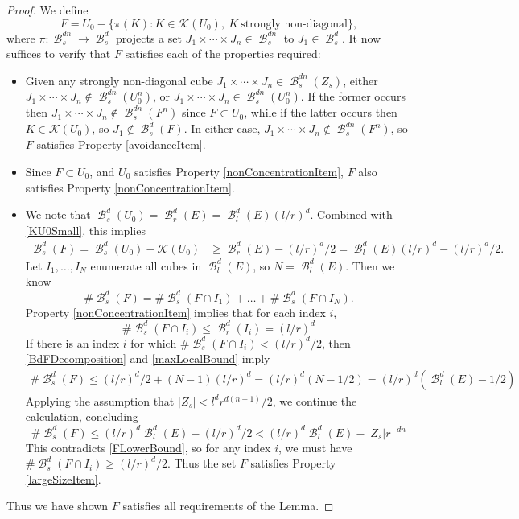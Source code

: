 \documentclass[dvipsnames,letterpaper,12pt]{article}
\numberwithin{equation}{section}
\theoremstyle{plain}
\DeclareMathOperator{\B}{\mathcal{B}}
\begin{document}
\begin{proof}
	We define
	\begin{equation}\label{defnOfF}
		F = U_0 - \{ \pi(K)\colon K\in \mathcal{K}(U_0),\ K\ \textrm{strongly non-diagonal} \},
	\end{equation} 
	where $\pi\colon \B_s^{dn}\to \B_s^d$ projects a set $J_1\times\cdots\times J_n \in \B_s^{dn}$ to $J_1 \in \B_s^d$. It now suffices to verify that $F$ satisfies each of the properties required:
	\begin{itemize}
		\item Given any strongly non-diagonal cube $J_1 \times \cdots \times J_n \in \B_s^{dn}(Z_s)$, either $J_1 \times \cdots \times J_n \not \in \B_s^{dn}(U_0^n)$, or $J_1 \times \cdots \times J_n \in \B_s^{dn}(U_0^n)$. If the former occurs then $J_1 \times \cdots \times J_n \not \in \B_s^{dn}(F^n)$ since $F\subset U_0$, while if the latter occurs then $K \in \mathcal{K}(U_0)$, so $J_1 \not \in \B_s^d(F)$. In either case, $J_1 \times \cdots \times J_n \not \in \B_s^{dn}(F^n)$, so $F$ satisfies Property \ref{avoidanceItem}.

		\item Since $F\subset U_0$, and $U_0$ satisfies Property \ref{nonConcentrationItem}, $F$ also satisfies Property \ref{nonConcentrationItem}.

		\item We note that $\B^d_s(U_0) = \B^d_r(E) = \B^d_l(E) (l/r)^d$. Combined with \eqref{KU0Small}, this implies
		\begin{equation} \label{FLowerBound}
		\begin{split}
			\B^d_s(F) = \B^d_s(U_0) - \mathcal{K}(U_0) &\geq \B^d_r(E) - (l/r)^d/2 = \B^d_l(E) (l/r)^d - (l/r)^d/2.
		\end{split}
		\end{equation}
		Let $I_1, \dots, I_N$ enumerate all cubes in $\B^d_l(E)$, so $N = \B^d_l(E)$. Then we know
		\begin{equation} \label{BdFDecomposition}
			\# \B^d_s(F) = \# \B^d_s(F \cap I_1) + \dots + \# \B^d_s(F \cap I_N).
		\end{equation}
		Property \ref{nonConcentrationItem} implies that for each index $i$,
		\begin{equation} \label{maxLocalBound}
			\# \B^d_s(F \cap I_i) \leq \B^d_r(I_i) = (l/r)^d
		\end{equation}
		If there is an index $i$ for which $\# \B^d_s(F \cap I_i) < (l/r)^d/2$, then \eqref{BdFDecomposition} and \eqref{maxLocalBound} imply
		\begin{align*}
			\# \B^d_s(F) \leq (l/r)^d/2 + (N - 1)(l/r)^d = (l/r)^d(N - 1/2) = (l/r)^d(\B^d_l(E) - 1/2)
		\end{align*}
		Applying the assumption that $|Z_s| < l^d r^{d(n-1)} / 2$, we continue the calculation, concluding
		\[ \# \B^d_s(F) \leq (l/r)^d \B^d_l(E) - (l/r)^d/2 < (l/r)^d \B^d_l(E) - |Z_s| r^{-dn} \]
		This contradicts \eqref{FLowerBound}, so for any index $i$, we must have $\# \B^d_s(F \cap I_i) \geq (l/r)^d/2$. Thus the set $F$ satisfies Property \ref{largeSizeItem}.
	\end{itemize}
	Thus we have shown $F$ satisfies all requirements of the Lemma.
\end{proof}
\end{document}
